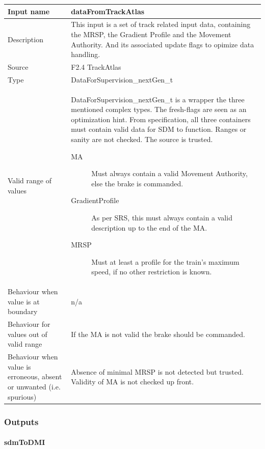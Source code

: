 \begin{longtable}{p{}p{}}
\toprule
Input name				& dataFromTrackAtlas \\
\midrule
Description				& This input is a set of track related input data, containing the MRSP, the Gradient Profile and the Movement Authority. And its associated update flags to opimize data handling.\\
\midrule
Source					& F2.4 TrackAtlas \\ 
\midrule
Type					& DataForSupervision\_nextGen\_t \\
\midrule
Valid range of values	& DataForSupervision\_nextGen\_t is a wrapper the three mentioned complex types. The fresh-flags are seen as an optimization hint. From specification, all three containers must contain valid data for SDM to function. Ranges or sanity are not checked. The source is trusted.
\begin{description}
\item[MA] Must always contain a valid Movement Authority, else the brake is commanded.
\item[GradientProfile] As per SRS, this must always contain a valid description up to the end of the MA.
\item[MRSP] Must at least a profile for the train's maximum speed, if no other restriction is known.
\end{description}\\
\midrule
Behaviour when value is at boundary	& n/a \\
\midrule
Behaviour for values out of valid range	& If the MA is not valid the brake should be commanded. \\
\midrule
Behaviour when value is erroneous, absent or unwanted (i.e. spurious) & Absence of minimal MRSP is not detected but trusted. Validity of MA is not checked up front.\\
\bottomrule
\end{longtable}


\subsubsection{Outputs}\label{s:SDM_outputs}

\paragraph{sdmToDMI}

